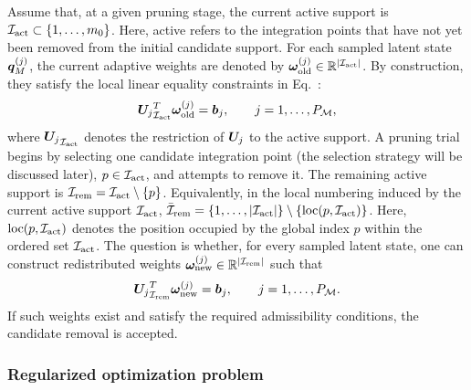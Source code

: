 \documentclass[preprint,10pt]{elsarticle}  %
\newcommand{\PROMPT}[1]{ }
\begin{document}
Assume that, at a given pruning stage, the current active support is $\mathcal{I}_{\mathrm{act}} \subset \{1,\ldots,m_0\}$.
Here, active refers to the integration points that have not yet been
removed from the initial candidate support.   For each sampled latent state \(\bm{q}_M^{(j)}\), the current adaptive
weights are denoted by $\bm{\omega}^{(j)}_{\mathrm{old}}\in\mathbb{R}^{|\mathcal{I}_{\mathrm{act}}|}$.  By construction, they satisfy the local linear equality constraints in Eq.~:
\begin{equation}
{\bm{U}_{j}}_{\mathcal{I}_{\mathrm{act}}}^{T}\bm{\omega}^{(j)}_{\mathrm{old}}
=
\bm{b}_{j},
\qquad
j=1,\ldots,P_{\mathcal{M}},
\end{equation}
where \({\bm{U}_{j}}_{\mathcal{I}_{\mathrm{act}}}\) denotes the restriction of \(\bm{U}_{j}\) to
the active support.  A pruning trial begins by selecting one candidate integration point
(the selection strategy will be discussed later), $
p\in\mathcal{I}_{\mathrm{act}}$, and attempts to remove it. The remaining active support is $\mathcal{I}_{\mathrm{rem}} =
\mathcal{I}_{\mathrm{act}}\setminus\{p\}$. Equivalently, in the local numbering induced by the current active
support \(\mathcal{I}_{\mathrm{act}}\), $\mathcal{\bar{I}}_{\mathrm{rem}} = \{1,\ldots,|\mathcal{I}_{\mathrm{act}}|\}\setminus\{\operatorname{loc}(p,\mathcal{I}_{\mathrm{act}})\}$.
Here, \(\operatorname{loc}(p,\mathcal{I}_{\mathrm{act}})\) denotes the position occupied by the global
index \(p\) within the ordered set \(\mathcal{I}_{\mathrm{act}}\). The question is whether, for every sampled latent state, one can construct redistributed weights $\bm{\omega}^{(j)}_{\mathrm{new}}\in\mathbb{R}^{|\mathcal{I}_{\mathrm{rem}}|}$
such that
\begin{equation}
{\bm{U}_{j}}^T_{\mathcal{I}_{\mathrm{rem}}}\bm{\omega}^{(j)}_{\mathrm{new}}
=
\bm{b}_{j},
\qquad
j=1,\ldots,P_{\mathcal{M}}.
\end{equation}
If such weights exist and satisfy the required admissibility conditions,
the candidate removal is accepted.






\subsubsection{Regularized optimization problem}
\label{sec:regoptprobl}

%
\end{document}
